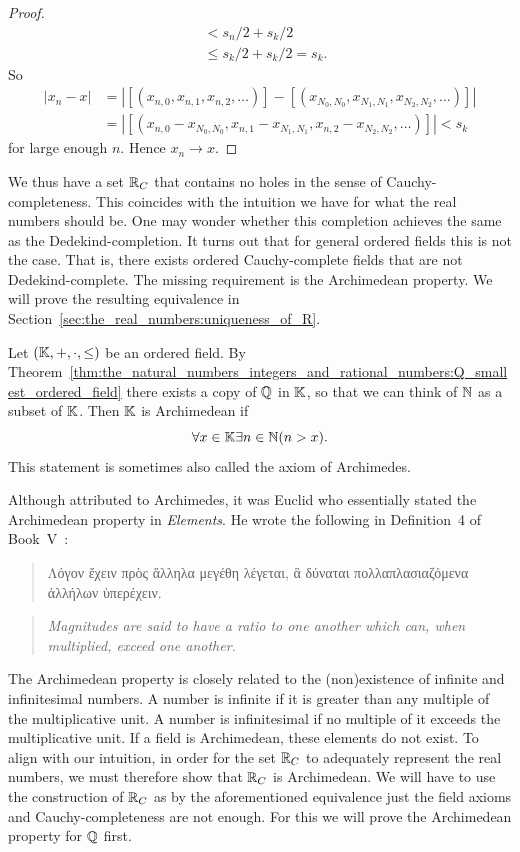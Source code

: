 \documentclass[../main.tex]{subfiles}
\begin{document}
\begin{proof}
\begin{align*}
        & <s_n/2+s_k/2 \\
        & \leq s_k/2+s_k/2=s_k.
    \end{align*}
    So 
    \begin{align*}
        \vert x_n-x\vert & =\left\vert[(x_{n,0},x_{n,1},x_{n,2},\dots)]-[(x_{N_0,N_0},x_{N_1,N_1},x_{N_2,N_2},\dots)]\right\vert \\
        & =\left\vert[(x_{n,0}-x_{N_0,N_0},x_{n,1}-x_{N_1,N_1},x_{n,2}-x_{N_2,N_2},\dots)]\right\vert<s_k
    \end{align*}
    for large enough $n$. Hence $x_n\to x$.
\end{proof}
We thus have a set $\mathbb{R}_C$ that contains no holes in the sense of Cauchy-completeness. This coincides with the intuition we have for what the real numbers should be. One may wonder whether this completion achieves the same as the Dedekind-completion. It turns out that for general ordered fields this is not the case. That is, there exists ordered Cauchy-complete fields that are not Dedekind-complete. The missing requirement is the Archimedean property. We will prove the resulting equivalence in Section~\ref{sec:the_real_numbers:uniqueness_of_R}.
\begin{definition}
    Let $(\mathbb{K},+,\cdot,\leq)$ be an ordered field. By Theorem~\ref{thm:the_natural_numbers_integers_and_rational_numbers:Q_smallest_ordered_field} there exists a copy of $\mathbb{Q}$ in $\mathbb{K}$, so that we can think of $\mathbb{N}$ as a subset of $\mathbb{K}$. Then $\mathbb{K}$ is Archimedean if
    \begin{equation*}
        \forall x\in\mathbb{K}\exists n\in\mathbb{N}(n>x).
    \end{equation*}
    This statement is sometimes also called the axiom of Archimedes.
\end{definition}
Although attributed to Archimedes, it was Euclid who essentially stated the Archimedean property in \textit{Elements}. He wrote the following in Definition~4 of Book~V~\cite{Heath1926}:
\begin{quote}
    \textgreek{Λόγον ἔχειν πρὸς ἄλληλα μεγέθη λέγεται, ἃ δύναται πολλαπλασιαζόμενα ἀλλήλων ὑπερέχειν.}
\end{quote}
\begin{quote}
    \textit{Magnitudes are said to have a ratio to one another which can, when multiplied, exceed one another.}
\end{quote}
The Archimedean property is closely related to the (non)existence of infinite and infinitesimal numbers. A number is infinite if it is greater than any multiple of the multiplicative unit. A number is infinitesimal if no multiple of it exceeds the multiplicative unit. If a field is Archimedean, these elements do not exist. To align with our intuition, in order for the set $\mathbb{R}_C$ to adequately represent the real numbers, we must therefore show that $\mathbb{R}_C$ is Archimedean. We will have to use the construction of $\mathbb{R}_C$ as by the aforementioned equivalence just the field axioms and Cauchy-completeness are not enough. For this we will prove the Archimedean property for $\mathbb{Q}$ first.
\end{document}
